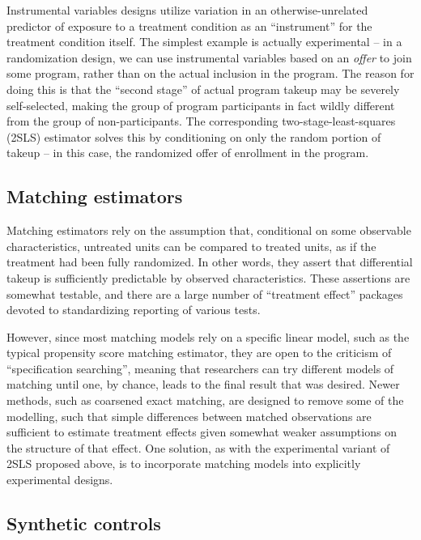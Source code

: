 Instrumental variables designs utilize variation in an
otherwise-unrelated predictor of exposure to a treatment condition
as an ``instrument'' for the treatment condition itself.
The simplest example is actually experimental --
in a randomization design, we can use instrumental variables
based on an \textit{offer} to join some program,
rather than on the actual inclusion in the program.
The reason for doing this is that the ``second stage''
of actual program takeup may be severely self-selected,
making the group of program participants in fact
wildly different from the group of non-participants.
The corresponding two-stage-least-squares (2SLS) estimator
solves this by conditioning on only the random portion of takeup --
in this case, the randomized offer of enrollment in the program.

\subsection{Matching estimators}

Matching estimators rely on the assumption that,
conditional on some observable characteristics,
untreated units can be compared to treated units,
as if the treatment had been fully randomized.
In other words, they assert that differential takeup
is sufficiently predictable by observed characteristics.
These assertions are somewhat testable,
and there are a large number of ``treatment effect''
packages devoted to standardizing reporting of various tests.

However, since most matching models rely on a specific linear model,
such as the typical propensity score matching estimator,
they are open to the criticism of ``specification searching'',
meaning that researchers can try different models of matching
until one, by chance, leads to the final result that was desired.
Newer methods, such as coarsened exact matching\cite{iacus2012causal},
are designed to remove some of the modelling,
such that simple differences between matched observations
are sufficient to estimate treatment effects
given somewhat weaker assumptions on the structure of that effect.
One solution, as with the experimental variant of 2SLS proposed above,
is to incorporate matching models into explicitly experimental designs.

\subsection{Synthetic controls}

